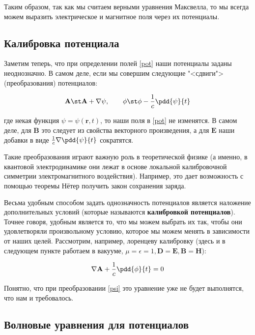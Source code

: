 \documentclass[12pt]{kiarticle}
\begin{document}
Таким образом, так как мы считаем верными уравнения Максвелла, то мы всегда можем выразить электрическое и магнитное поля через их потенциалы.

\subsection{Калибровка потенциала}

Заметим теперь, что при определении полей \eqref{pot} наши потенциалы заданы неоднозначно. В самом деле, если мы совершим следующие "<сдвиги"> (преобразования) потенциалов: 

\begin{equation}\label{psi}
\mathbf{A} \st \mathbf{A} + \nabla \psi, \qquad \phi \st \phi - \dfrac{1}{c} \pdd{\psi}{t}
\end{equation}

где некая функция $ \psi = \psi(\mathbf{r}, t) $, то наши поля в \eqref{pot} не изменятся. В самом деле, для $ \mathbf{B}  $ это следует из свойства векторного произведения, а для $ \mathbf{E} $ наши добавки в виде $ \frac{1}{c} \nabla \pdd{\psi}{t} $ сократятся. 

Такие преобразования играют важную роль в теоретической физике (а именно, в квантовой электродинамике они лежат в основе локальной калибровочной симметрии электромагнитного воздействия). Например, это дает возможность с помощью теоремы Нётер получить закон сохранения заряда. 

Весьма удобным способом задать однозначность потенциалов является наложение дополнительных условий (которые называются \textbf{калибровкой потенциалов}). Точнее говоря, удобным является то, что мы можем выбрать их так, чтобы они удовлетворяли произвольному условию, которое мы можем менять в зависимости от наших целей. Рассмотрим, например, лоренцеву калибровку (здесь и в следующем пункте работаем в вакууме, $ \mu = \epsilon = 1, \mathbf{D} = \mathbf{E}, \mathbf{B} = \mathbf{H} $): 

\begin{equation}\label{Lorents}
\nabla \mathbf{A}+ \dfrac{1}{c} \pdd{\phi}{t} = 0
\end{equation}

Понятно, что при преобразовании \eqref{psi} это уравнение уже не будет выполнятся, что нам и требовалось.



\subsection{Волновые уравнения для потенциалов}
\end{document}
